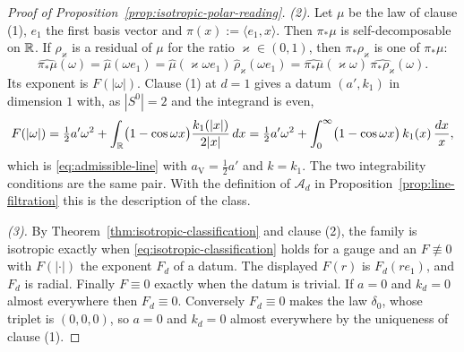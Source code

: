 \begin{proof}[Proof of Proposition~\ref{prop:isotropic-polar-reading}]
\emph{(2).} Let $\mu$ be the law of clause (1), $e_1$ the first basis vector and $\pi(x) :=
\langle e_1,x\rangle$. Then $\pi_*\mu$ is self-decomposable on $\mathbb{R}$. If $\rho_\varkappa$ is a
residual of $\mu$ for the ratio $\varkappa \in (0,1)$, then $\pi_*\rho_\varkappa$ is one of
$\pi_*\mu$:
\[
  \widehat{\pi_*\mu}(\omega) = \widehat\mu(\omega e_1)
   = \widehat\mu(\varkappa\omega e_1)\,\widehat\rho_\varkappa(\omega e_1)
   = \widehat{\pi_*\mu}(\varkappa\omega)\,\widehat{\pi_*\rho_\varkappa}(\omega) .
\]
Its exponent is $F(|\omega|)$.
Clause (1) at $d = 1$ gives a datum $(a',k_1)$ in dimension $1$ with, as $|S^0| = 2$ and the
integrand is even,
\[
  F(|\omega|) = \tfrac12 a'\omega^2 + \int_{\mathbb{R}}\bigl(1 - \cos\omega x\bigr)\frac{k_1(|x|)}{2|x|}\,dx
   = \tfrac12 a'\omega^2 + \int_0^\infty\bigl(1 - \cos\omega x\bigr)\,k_1(x)\,\frac{dx}{x} ,
\]
which is \ref{eq:admissible-line} with $a_{\mathrm V} = \tfrac12 a'$ and $k = k_1$. The two
integrability conditions are the same pair. With the definition of $\mathcal{A}_d$ in
Proposition~\ref{prop:line-filtration} this is the description of the class.

\emph{(3).} By Theorem~\ref{thm:isotropic-classification} and clause (2), the family is isotropic exactly
when \ref{eq:isotropic-classification} holds for a gauge and an $F \not\equiv 0$ with $F(|\cdot|)$
the exponent $F_d$ of a datum. The displayed $F(r)$ is $F_d(re_1)$, and $F_d$ is radial. Finally
$F \equiv 0$ exactly when the datum is trivial. If $a = 0$ and $k_d = 0$ almost everywhere then
$F_d \equiv 0$. Conversely $F_d \equiv 0$ makes the law $\delta_0$, whose triplet is $(0,0,0)$,
so $a = 0$ and $k_d = 0$ almost everywhere by the uniqueness of clause (1).
\end{proof}

